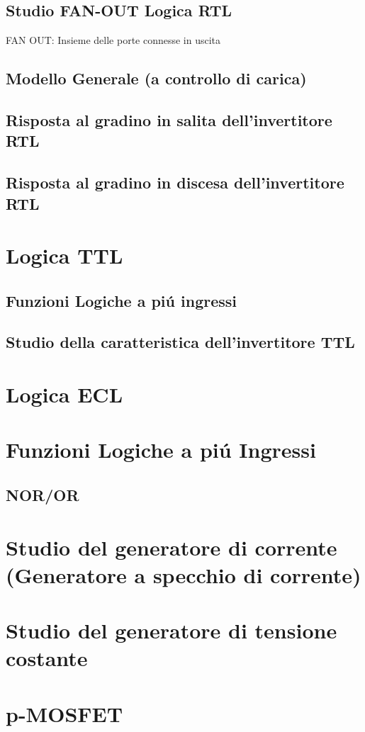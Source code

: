 \documentclass{article}
\begin{document}
\subsection{Studio FAN-OUT Logica RTL}
FAN OUT: Insieme delle porte connesse in uscita

\subsection{Modello Generale (a controllo di carica)}
\subsection{Risposta al gradino in salita dell'invertitore RTL}
\subsection{Risposta al gradino in discesa dell'invertitore RTL}
\section{Logica TTL}
\subsection{Funzioni Logiche a pi\'u ingressi}
\subsection{Studio della caratteristica dell'invertitore TTL}
\section{Logica ECL}
\section{Funzioni Logiche a pi\'u Ingressi}
\subsection{NOR/OR}
\section{Studio del generatore di corrente (Generatore a specchio di corrente)}
\section{Studio del generatore di tensione costante}
\section{p-MOSFET}
\end{document}
